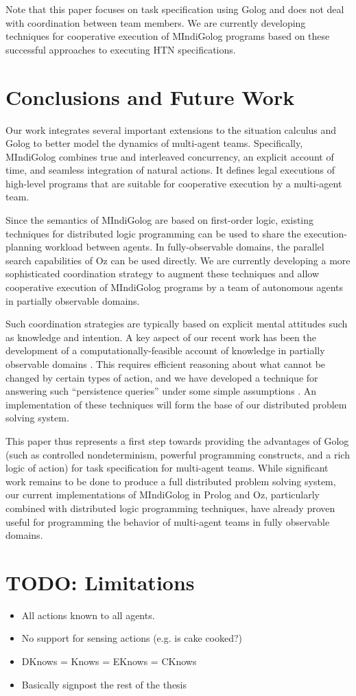 Note that this paper focuses on task specification using Golog and
does not deal with coordination between team members. We are currently
developing techniques for cooperative execution of MIndiGolog programs
based on these successful approaches to executing HTN specifications.


\section{Conclusions and Future Work\label{sec:Conclusions}}

Our work integrates several important extensions to the situation
calculus and Golog to better model the dynamics of multi-agent teams.
Specifically, MIndiGolog combines true and interleaved concurrency,
an explicit account of time, and seamless integration of natural actions.
It defines legal executions of high-level programs that are suitable
for cooperative execution by a multi-agent team.

Since the semantics of MIndiGolog are based on first-order logic,
existing techniques for distributed logic programming can be used
to share the execution-planning workload between agents. In fully-observable
domains, the parallel search capabilities of Oz can be used directly.
We are currently developing a more sophisticated coordination strategy
to augment these techniques and allow cooperative execution of MIndiGolog
programs by a team of autonomous agents in partially observable domains.

Such coordination strategies are typically based on explicit mental
attitudes such as knowledge and intention. A key aspect of our recent
work has been the development of a computationally-feasible account
of knowledge in partially observable domains \cite{kelly07sc_know_obs}.
This requires efficient reasoning about what cannot be changed by
certain types of action, and we have developed a technique for answering
such {}``persistence queries'' under some simple assumptions \cite{kelly07sc_persistence}.
An implementation of these techniques will form the base of our distributed
problem solving system.

This paper thus represents a first step towards providing the advantages
of Golog (such as controlled nondeterminism, powerful programming
constructs, and a rich logic of action) for task specification for
multi-agent teams. While significant work remains to be done to produce
a full distributed problem solving system, our current implementations
of MIndiGolog in Prolog and Oz, particularly combined with distributed
logic programming techniques, have already proven useful for programming
the behavior of multi-agent teams in fully observable domains.


\section{TODO: Limitations}

\begin{itemize}
\item All actions known to all agents. 
\item No support for sensing actions (e.g. is cake cooked?) 
\item DKnows = Knows = EKnows = CKnows 
\item Basically signpost the rest of the thesis 
\end{itemize}

